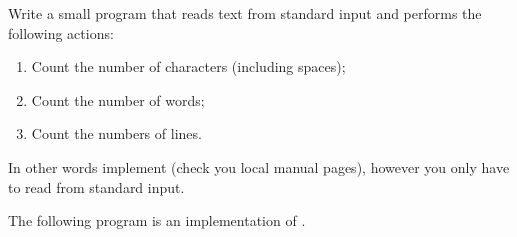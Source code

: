 \begin{Exercise}[title={Word and letter count},difficulty=5]
\label{ex:wc}
\Question\label{ex:wc q1} Write a small program that reads text from
standard input and performs the following actions:
\begin{enumerate}
\item{Count the number of characters (including spaces);}
\item{Count the number of words;}
\item{Count the numbers of lines.}
\end{enumerate}
In other words implement  (check you local manual pages),
however you only have to read from standard input.
\end{Exercise}

\begin{Answer}
\Question The following program is an implementation of .
\end{Answer}
